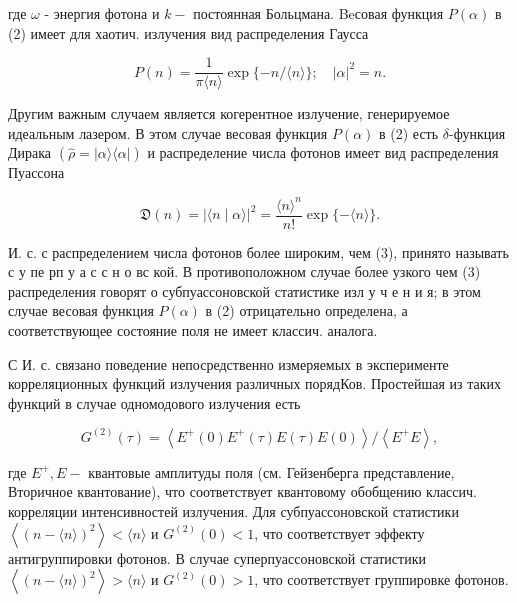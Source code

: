 \documentclass[10pt]{article}
\begin{document}
где $\omega$ - энергия фотона и $k-$ постоянная Больцмана. Beсовая функция $P(\alpha)$ в (2) имеет для хаотич. излучения вид распределения Гаусса



\[

P(n)=\frac{1}{\pi\langle n\rangle} \exp \{-n /\langle n\rangle\} ; \quad|\alpha|^{2}=n .

\]



Другим важным случаем является когерентное излучение, генерируемое идеальным лазером. В этом случае весовая функция $P(\alpha)$ в (2) есть $\delta$-функция Дирака $(\hat{\rho}=|\alpha\rangle\langle\alpha|)$ и распределение числа фотонов имеет вид распределения Пуассона



\[

\mathfrak{D}(n)=|\langle n \mid \alpha\rangle|^{2}=\frac{\langle n\rangle^{n}}{n !} \exp \{-\langle n\rangle\} .

\]



И. с. с распределением числа фотонов более широким, чем (3), принято называть с у пе рп у а с с н о вс кой. В противоположном случае более узкого чем (3) распределения говорят о субпуассоновской статистике изл у ч е н и я; в этом случае весовая функция $P(\alpha)$ в (2) отрицательно определена, а соответствующее состояние поля не имеет классич. аналога.



С И. с. связано поведение непосредственно измеряемых в эксперименте корреляционных функций излучения различных порядКов. Простейшая из таких функций в случае одномодового излучения есть



\[

G^{(2)}(\tau)=\left\langle E^{+}(0) E^{+}(\tau) E(\tau) E(0)\right\rangle /\left\langle E^{+} E\right\rangle,

\]



где $E^{+}, E-$ квантовые амплитуды поля (см. Гейзенберга представление, Вторичное квантование), что соответствует квантовому обобщению классич. корреляции интенсивностей излучения. Для субпуассоновской статистики $\left\langle(n-\langle n\rangle)^{2}\right\rangle<\langle n\rangle$ и $G^{(2)}(0)<1$, что соответствует эффекту антигруппировки фотонов. В случае суперпуассоновской статистики $\left\langle(n-\langle n\rangle)^{2}\right\rangle>\langle n\rangle$ и $G^{(2)}(0)>1$, что соответствует группировке фотонов.
\end{document}
